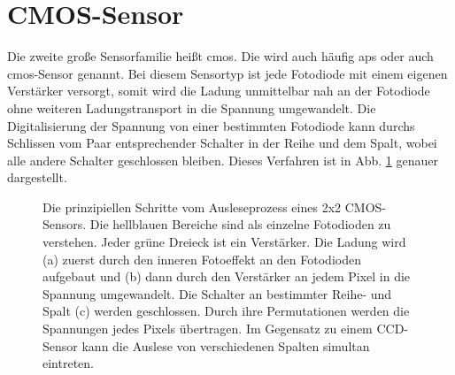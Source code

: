\section{CMOS-Sensor}
\label{text:cmos_theorie}
Die zweite große Sensorfamilie heißt \gls{cmos}. Die wird auch häufig \gls{aps} oder auch \gls{cmos}-Sensor genannt. Bei diesem Sensortyp ist jede Fotodiode mit einem eigenen Verstärker versorgt, somit wird die Ladung unmittelbar nah an der Fotodiode ohne weiteren Ladungstransport in die Spannung umgewandelt. Die Digitalisierung der Spannung von einer bestimmten Fotodiode kann durchs Schlissen vom Paar entsprechender Schalter in der Reihe und dem Spalt, wobei alle andere Schalter geschlossen bleiben. Dieses Verfahren ist in Abb. \ref{fig:cmos_scheme} genauer dargestellt.
\begin{figure}[H]
    \centering
    \hfill
    \hfill
    \caption{Die prinzipiellen Schritte vom Ausleseprozess eines 2x2 CMOS-Sensors. Die hellblauen Bereiche sind als einzelne Fotodioden zu verstehen. Jeder grüne Dreieck ist ein Verstärker. Die Ladung wird (a) zuerst durch den inneren Fotoeffekt an den Fotodioden aufgebaut und (b) dann durch den Verstärker an jedem Pixel in die Spannung umgewandelt. Die Schalter an bestimmter Reihe- und Spalt (c) werden geschlossen. Durch ihre Permutationen werden die Spannungen jedes Pixels übertragen. Im Gegensatz zu einem CCD-Sensor kann die Auslese von verschiedenen Spalten simultan eintreten.}
    \label{fig:cmos_scheme}
\end{figure}
